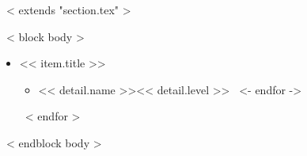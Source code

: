 ~< extends "section.tex" >~


~< block body >~
  \begin{itemize}
    ~< for item in items >~
      \item << item.title >>
      \begin{itemize}
        ~< for detail in item.details ->~
          \item << detail.name >>\hfill << detail.level >>
        ~<- endfor ->~
      \end{itemize}
    ~< endfor >~
  \end{itemize}
~< endblock body >~
